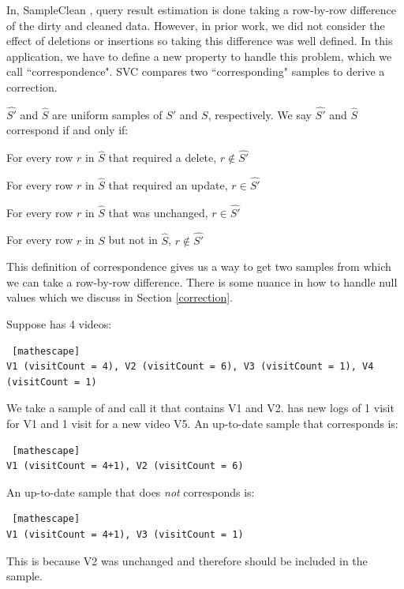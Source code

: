 In, SampleClean \cite{wang1999sample}, \nsc query result estimation is done taking a row-by-row difference of the dirty and cleaned data.
However, in prior work, we did not consider the effect of deletions or insertions so taking this difference was well defined.
In this application, we have to define a new property to handle this problem, which we call ``correspondence".
SVC compares two ``corresponding" samples to derive a correction. 
\begin{definition}[Correspondence]
$\hat{S'}$ and $\hat{S}$ are uniform samples of $S'$ and $S$, respectively.  We say $\hat{S'}$ and $\hat{S}$ correspond if and only if:
\item For every row $r$ in $\hat{S}$ that required a delete, $r \not\in \hat{S'}$
\item For every row $r$ in $\hat{S}$ that required an update, $r\in \hat{S'}$
\item For every row $r$ in $\hat{S}$  that was unchanged, $r \in \hat{S'}$
\item For every row $r$ in $S$ but not in $\hat{S}$, $r \not\in \hat{S'}$
\label{correspondence}
\end{definition}
This definition of correspondence gives us a way to get two samples from which we can take a row-by-row difference.
There is some nuance in how to handle null values which we discuss in Section \ref{correction}.

\begin{example}[Correspondence]
Suppose  has 4 videos: 
\begin{lstlisting} [mathescape]
V1 (visitCount = 4), V2 (visitCount = 6), V3 (visitCount = 1), V4 (visitCount = 1)
\end{lstlisting}
We take a sample of  and call it  that contains V1 and V2.
 has new logs of 1 visit for V1 and 1 visit for a new video V5.
An up-to-date sample that corresponds is:
\begin{lstlisting} [mathescape]
V1 (visitCount = 4+1), V2 (visitCount = 6)
\end{lstlisting}
An up-to-date sample that does \emph{not} corresponds is: 
\begin{lstlisting} [mathescape]
V1 (visitCount = 4+1), V3 (visitCount = 1)
\end{lstlisting}
This is because V2 was unchanged and therefore should be included in the sample.
\end{example}

